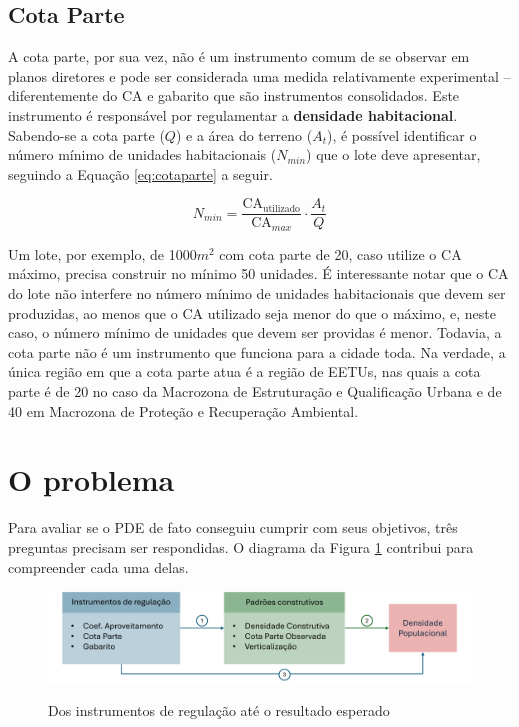 \subsection*{Cota Parte}

A cota parte, por sua vez, não é um instrumento comum de se observar em planos diretores e pode ser considerada uma medida relativamente experimental -- diferentemente do CA e gabarito que são instrumentos consolidados. Este instrumento é responsável por regulamentar a \textbf{densidade habitacional}. Sabendo-se a cota parte ($Q$) e a área do terreno ($A_t$), é possível identificar o número mínimo de unidades habitacionais ($N_{min}$) que o lote deve apresentar, seguindo a Equação \ref{eq:cotaparte} a seguir. 

\begin{equation}
    N_{min} = \frac{\text{CA}_{\text{utilizado}}}{\text{CA}_{max}}\cdot \frac{A_t}{Q}
    \label{eq:cotaparte}
\end{equation}

Um lote, por exemplo, de 1000$m^2$ com cota parte de 20, caso utilize o CA máximo, precisa construir no mínimo 50 unidades. É interessante notar que o CA do lote não interfere no número mínimo de unidades habitacionais que devem ser produzidas, ao menos que o CA utilizado seja menor do que o máximo, e, neste caso, o número mínimo de unidades que devem ser providas é menor. Todavia, a cota parte não é um instrumento que funciona para a cidade toda. Na verdade, a única região em que a cota parte atua é a região de EETUs, nas quais a cota parte é de 20 no caso da Macrozona de Estruturação e Qualificação Urbana e de 40 em Macrozona de Proteção e Recuperação Ambiental.

\section{O problema}
\label{sec:problema}

Para avaliar se o PDE de fato conseguiu cumprir com seus objetivos, três preguntas precisam ser respondidas. O diagrama da Figura \ref{fig:diagrama} contribui para compreender cada uma delas.

\begin{figure}[h]
    \caption{Dos instrumentos de regulação até o resultado esperado}
    \includegraphics[width = \linewidth]{figuras/desenho_proposta.pdf}
    \label{fig:diagrama}
\end{figure}

